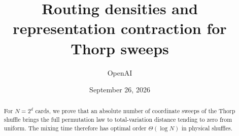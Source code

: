 \documentclass[11pt]{article}
\title{Routing densities and representation contraction for Thorp sweeps}
\author{OpenAI}
\date{September 26, 2026}
\theoremstyle{definition}
\theoremstyle{remark}
\begin{document}
\maketitle
\begin{abstract}
For $N=2^d$ cards, we prove that an absolute number of coordinate sweeps of the Thorp shuffle brings the full permutation law to total-variation distance tending to zero from uniform. The mixing time therefore has optimal order $\Theta(\log N)$ in physical shuffles.
\end{abstract}

\tableofcontents













\end{document}
